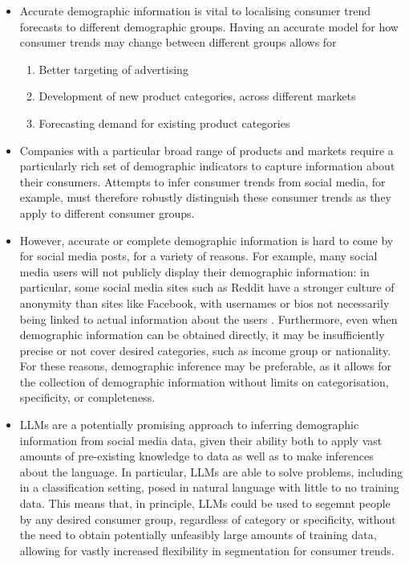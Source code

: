 \documentclass{report}
\begin{document}
\begin{itemize}
\item Accurate demographic information is vital to localising consumer trend forecasts to different demographic groups. Having an accurate model for how consumer trends may change between different groups allows for
\begin{enumerate}
\item Better targeting of advertising

\item Development of new product categories, across different markets

\item Forecasting demand for existing product categories
\end{enumerate}

\item Companies with a particular broad range of products and markets require a particularly rich set of demographic indicators to capture information about their consumers. Attempts to infer consumer trends from social media, for example, must therefore robustly distinguish these consumer trends as they apply to different consumer groups.

\item However, accurate or complete demographic information is hard to come by for social media posts, for a variety of reasons. For example, many social media users will not publicly display their demographic information: in particular, some social media sites such as Reddit have a stronger culture of anonymity than sites like Facebook, with usernames or bios not necessarily being linked to actual information about the users \cite{reddit-pseudoanonymous}. Furthermore, even when demographic information can be obtained directly, it may be insufficiently precise or not cover desired categories, such as income group or nationality. For these reasons, demographic inference may be preferable, as it allows for the collection of demographic information without limits on categorisation, specificity, or completeness.

\item LLMs are a potentially promising approach to inferring demographic information from social media data, given their ability both to apply vast amounts of pre-existing knowledge to data as well as to make inferences about the language. In particular, LLMs are able to solve problems, including in a classification setting, posed in natural language with little to no training data. This means that, in principle, LLMs could be used to segemnt people by any desired consumer group, regardless of category or specificity, without the need to obtain potentially unfeasibly large amounts of training data, allowing for vastly increased flexibility in segmentation for consumer trends.


\end{itemize}
\end{document}
